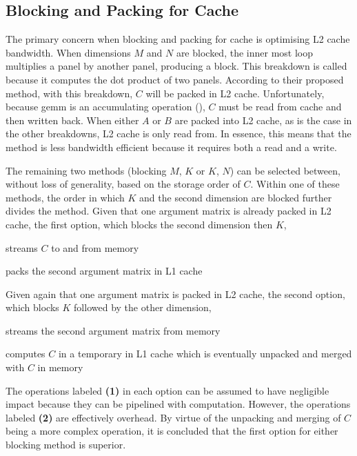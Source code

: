 \documentclass[\main/thesis.tex]{subfiles}
\begin{document}
\subsection{Blocking and Packing for Cache}
The primary concern when blocking and packing for cache is optimising L2 cache bandwidth.
When dimensions $M$ and $N$ are blocked, the inner most loop multiplies a panel by another panel, producing a block.
This breakdown is called  because it computes the dot product of two panels.
According to their proposed method, with this breakdown, $C$ will be packed in L2 cache.
Unfortunately, because \gls{gemm} is an accumulating operation (\eg {}), $C$ must be read from cache and then written back.
When either $A$ or $B$ are packed into L2 cache, as is the case in the other breakdowns, L2 cache is only read from.
In essence, this means that the  method is less bandwidth efficient because it requires both a read and a write.

The remaining two methods (blocking $M$, $K$ or $K$, $N$) can be selected between, without loss of generality, based on the storage order of $C$.
Within one of these methods, the order in which $K$ and the second dimension are blocked further divides the method.
Given that one argument matrix is already packed in L2 cache, the first option, which blocks the second dimension then $K$,
\begin{enumerate*}[itemjoin*={{ and }}, label=\textbf{(\arabic*)}, after={.}]
  \item streams $C$ to and from memory
  \item packs the second argument matrix in L1 cache
\end{enumerate*}
Given again that one argument matrix is packed in L2 cache, the second option, which blocks $K$ followed by the other dimension,
\begin{enumerate*}[itemjoin*={{ and }}, label=\textbf{(\arabic*)}, after={.}]
  \item streams the second argument matrix from memory
  \item computes $C$ in a temporary in L1 cache which is eventually unpacked and merged with $C$ in memory
\end{enumerate*}
The operations labeled \textbf{(1)} in each option can be assumed to have negligible impact because they can be pipelined with computation.
However, the operations labeled \textbf{(2)} are effectively overhead.
By virtue of the unpacking and merging of $C$ being a more complex operation, it is concluded that the first option for either blocking method is superior.
\end{document}
